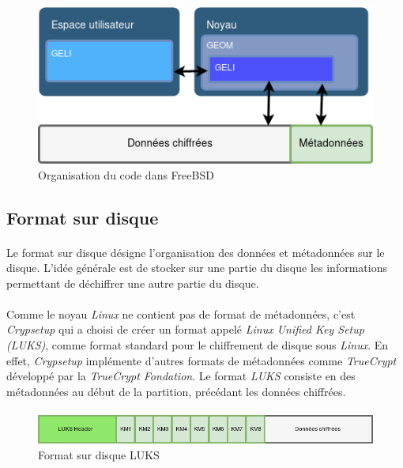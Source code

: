 \paragraph{}
\begin{figure}[h]
\centering
\includegraphics[width=.8\linewidth]{etat_art/organisation_FreeBSD.png}
\caption{\label{fig:OrgFreeBSD}Organisation du code dans FreeBSD}
\end{figure}

\subsection{Format sur disque}
\paragraph{}
Le format sur disque désigne l'organisation des données et métadonnées sur le 
disque. L'idée générale est de stocker sur une partie du disque les 
informations permettant de déchiffrer une autre partie du disque.
\paragraph{}
Comme le noyau {\em Linux} ne contient pas de format de métadonnées, 
c'est {\em Crypsetup} qui a choisi de créer un format appelé {\em Linux 
Unified Key Setup ({\em LUKS})}, comme format standard pour le chiffrement de 
disque sous {\em Linux}. En effet, {\em Crypsetup} implémente d'autres formats 
de métadonnées comme {\em TrueCrypt} développé par la 
{\em TrueCrypt Fondation}. 
Le format {\em LUKS} consiste en des métadonnées au début de la partition, 
précédant les données chiffrées.

\paragraph{}
\begin{figure}[h]
\centering
\includegraphics[width=.8\linewidth]{etat_art/format_disque_luks.png}
\caption{\label{fig:LUKSFormat}Format sur disque LUKS}
\end{figure}

